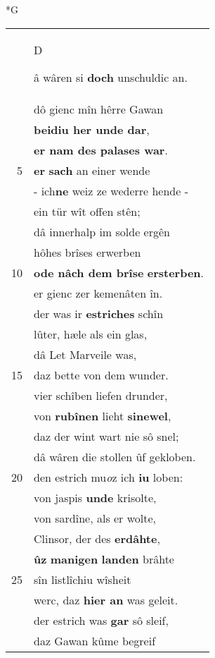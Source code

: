 \documentclass[8pt,a4paper,notitlepage]{article}
\begin{document}
\begin{table}[ht]
\begin{minipage}[t]{0.5\linewidth}
\small
\begin{center}*G
\end{center}
\begin{tabular}{rl}
 & \begin{large}D\end{large}â wâren si \textbf{doch} unschuldic an.\\ 
 & dô gienc mîn hêrre Gawan\\ 
 & \textbf{beidiu her unde dar},\\ 
 & \textbf{er nam des palases war}.\\ 
5 & \textbf{er} \textbf{sach} an einer wende\\ 
 & - ich\textbf{ne} weiz ze wederre hende -\\ 
 & ein tür wît offen stên;\\ 
 & dâ innerhalp im solde ergên\\ 
 & hôhes brîses erwerben\\ 
10 & \textbf{ode nâch dem brîse} \textbf{ersterben}.\\ 
 & er gienc zer kemenâten în.\\ 
 & der was ir \textbf{estriches} schîn\\ 
 & lûter, hæle als ein glas,\\ 
 & dâ Let Marveile was,\\ 
15 & daz bette von dem wunder.\\ 
 & vier schîben liefen drunder,\\ 
 & von \textbf{rubînen} lieht \textbf{sinewel},\\ 
 & daz der wint wart nie sô snel;\\ 
 & dâ wâren die stollen ûf gekloben.\\ 
20 & den estrich mu\textit{o}z ich \textbf{iu} loben:\\ 
 & von jaspis \textbf{unde} krisolte,\\ 
 & von sardîne, als er wolte,\\ 
 & Clinsor, der des \textbf{erdâhte},\\ 
 & \textbf{ûz} \textbf{manigen} \textbf{landen} brâhte\\ 
25 & sîn listlîchiu wîsheit\\ 
 & werc, daz \textbf{hier an} was geleit.\\ 
 & der estrich was \textbf{gar} sô sleif,\\ 
 & daz Gawan kûme begreif\\ 

\end{tabular}
\end{minipage}
\end{table}
\end{document}
